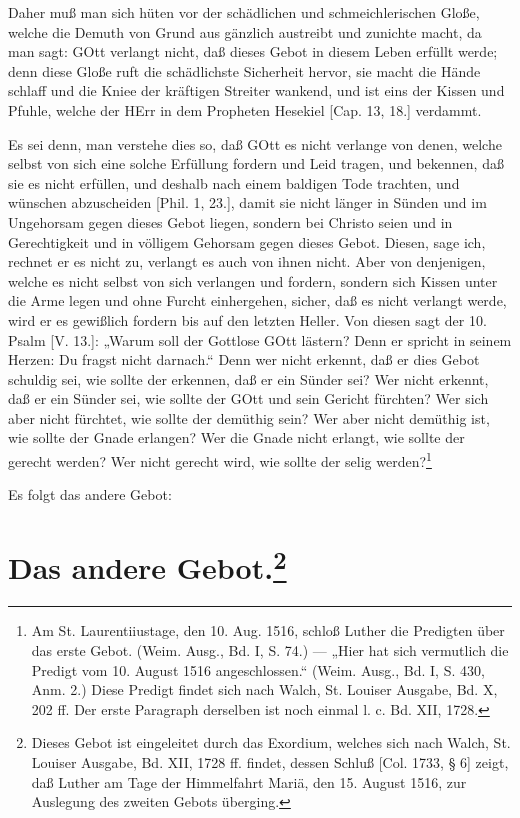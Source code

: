 Daher muß man sich hüten vor der schädlichen und schmeichlerischen Gloße, welche die Demuth von Grund aus gänzlich austreibt und zunichte macht, da man sagt: GOtt verlangt nicht, daß dieses Gebot in diesem Leben erfüllt werde; denn diese Gloße ruft die schädlichste Sicherheit hervor, sie macht die Hände schlaff und die Kniee der kräftigen Streiter wankend, und ist eins der Kissen und Pfuhle, welche der HErr in dem Propheten Hesekiel [Cap. 13, 18.] verdammt.

Es sei denn, man verstehe dies so, daß GOtt es nicht verlange von denen, welche selbst von sich eine solche Erfüllung fordern und Leid tragen, und bekennen, daß sie es nicht erfüllen, und deshalb nach einem baldigen Tode trachten, und wünschen abzuscheiden [Phil. 1, 23.], damit sie nicht länger in Sünden und im Ungehorsam gegen dieses Gebot liegen, sondern bei Christo seien und in Gerechtigkeit und in völligem Gehorsam gegen dieses Gebot. Diesen, sage ich, rechnet er es nicht zu, verlangt es auch von ihnen nicht. Aber von denjenigen, welche es nicht selbst von sich verlangen und fordern, sondern sich Kissen unter die Arme legen und ohne Furcht einhergehen, sicher, daß es nicht verlangt werde, wird er es gewißlich fordern bis auf den letzten Heller. Von diesen sagt der 10. Psalm [V. 13.]: „Warum soll der Gottlose GOtt lästern? Denn er spricht in seinem Herzen: Du fragst nicht darnach.“ Denn wer nicht erkennt, daß er dies Gebot schuldig sei, wie sollte der erkennen, daß er ein Sünder sei? Wer nicht erkennt, daß er ein Sünder sei, wie sollte der GOtt und sein Gericht fürchten? Wer sich aber nicht fürchtet, wie sollte der demüthig sein? Wer aber nicht demüthig ist, wie sollte der Gnade erlangen? Wer die Gnade nicht erlangt, wie sollte der gerecht werden? Wer nicht gerecht wird, wie sollte der selig werden?\footnote{Am St. Laurentiiustage, den 10. Aug. 1516, schloß Luther die Predigten über das erste Gebot. (Weim. Ausg., Bd. I, S. 74.) — „Hier hat sich vermutlich die Predigt vom 10. August 1516 angeschlossen.“ (Weim. Ausg., Bd. I, S. 430, Anm. 2.) Diese Predigt findet sich nach Walch, St. Louiser Ausgabe, Bd. X, 202 ff. Der erste Paragraph derselben ist noch einmal l. c. Bd. XII, 1728.}

Es folgt das andere Gebot:

\section[Das andere Gebot]{Das andere Gebot.\footnote{Dieses Gebot ist eingeleitet durch das Exordium, welches sich nach Walch, St. Louiser Ausgabe, Bd. XII, 1728 ff. findet, dessen Schluß [Col. 1733, § 6] zeigt, daß Luther am Tage der Himmelfahrt Mariä, den 15. August 1516, zur Auslegung des zweiten Gebots überging.}}

